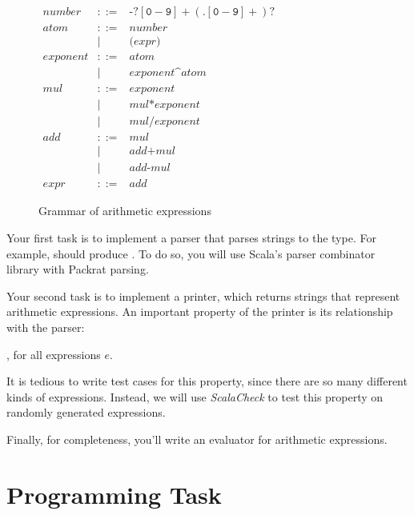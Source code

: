 \begin{figure}
\(
\begin{array}{rcl}
\mathit{number} & ::= & \texttt{-}?[\texttt{0}-\texttt{9}]+ (\texttt{.}[\texttt{0}-\texttt{9}]+)? \\
\mathit{atom} & ::= & \mathit{number} \\
              & \mid & \texttt{(} \mathit{expr} \texttt{)}  \\
\mathit{exponent} & ::= & \mathit{atom} \\
                 & \mid & \mathit{exponent} \texttt{\textasciicircum} \mathit{atom} \\
\mathit{mul} & ::= & \mathit{exponent} \\
& \mid & \mathit{mul} \texttt{*} \mathit{exponent} \\
& \mid & \mathit{mul} \texttt{/} \mathit{exponent} \\
\mathit{add} & ::= & \mathit{mul} \\
& \mid & \mathit{add} \texttt{+} \mathit{mul} \\
& \mid & \mathit{add} \texttt{-} \mathit{mul} \\
\mathit{expr} & ::= & \mathit{add}
\end{array}
\)
\caption{Grammar of arithmetic expressions}
\label{parsing_grammar}
\end{figure}

Your first task is to implement a parser that parses strings to the  type. For example,  should produce . To do so, you will use Scala's parser combinator library with Packrat parsing.

Your second task is to implement a printer, which returns strings that represent arithmetic expressions. An important property of the printer is its relationship with the parser:

, for all expressions $e$.

It is tedious to write test cases for this property, since there are so many different kinds of expressions. Instead, we will use \emph{ScalaCheck} to test this property on randomly generated expressions.

Finally, for completeness, you'll write an evaluator for arithmetic expressions.


\section{Programming Task}

